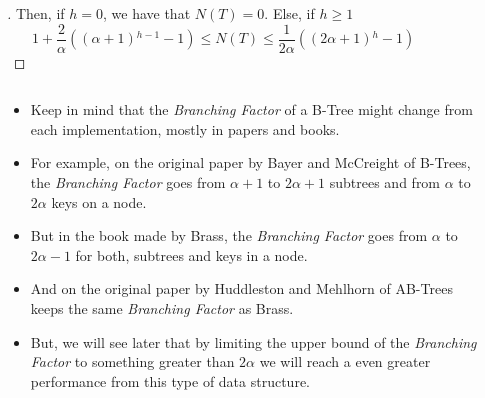 \begin{frame}
\begin{columns}
\begin{column}{\textlecolumn}
            \begin{block}{}
                \begin{proof}[\unskip\nopunct]
                    Then, if \(h = 0\), we have that \(N\left(T\right) = 0\). Else, if \(h \geq 1\)
                    \[
                        1 + \frac{2}{\alpha}\left(\left(\alpha + 1\right){}^{h - 1} - 1\right) 
                        \leq 
                        N\left(T\right) 
                        \leq 
                        \frac{1}{2\alpha}\left(\left(2\alpha + 1\right){}^{h} - 1\right)
                        \tag{Nodes Bounds}\label{btree-nodes-num}
                    \]
                \end{proof}
            \end{block}
        \end{column}
        \begin{column}{\textricolumn}
        \end{column}
    \end{columns}

    \framebreak{}

    \begin{columns}
        \begin{column}{\textlecolumn}
            \begin{block}{}
                \begin{itemize}
                    \item Keep in mind that the \emph{Branching Factor} of a B-Tree might change from each implementation, mostly in papers and books.
                    \item For example, on the original paper by Bayer and McCreight of B-Trees\cite{bayer_organization_1972}, the \emph{Branching Factor} 
                        goes from \(\alpha + 1\) to \(2\alpha + 1\) subtrees and from \(\alpha\) to \(2\alpha\) keys on a node.
                    \item But in the book made by Brass\cite{brass_advanced_2008}, the \emph{Branching Factor} goes from 
                        \(\alpha\) to \(2\alpha - 1\) for both, subtrees and keys in a node.
                    \item And on the original paper by Huddleston and Mehlhorn of AB-Trees\cite{huddleston_new_1982} keeps the same \emph{Branching Factor} as Brass.
                    \item But, we will see later that by limiting the upper bound of the \emph{Branching Factor} to something greater than \(2\alpha\) 
                        we will reach a even greater performance from this type of data structure.
                \end{itemize}
            \end{block}
        \end{column}
        \begin{column}{\textricolumn}
        \end{column}
    \end{columns}

\end{frame}
